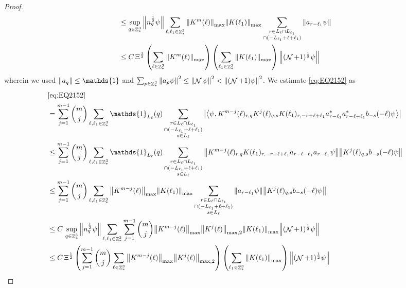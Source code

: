 \documentclass[sn-mathphys, Numbered ,a4paper]{sn-jnl}%
\DeclareMathOperator{\Z}{\mathbb{Z}}
\DeclareMathOperator{\NN}{\mathcal{N}}
\newcommand{\half}{\frac{1}{2}}
\newcommand{\eva}[1]{\left\langle #1 \right\rangle}
\theoremstyle{plain}
\theoremstyle{definition}
\theoremstyle{remark}
\theoremstyle{plain}
\theoremstyle{definition}
\theoremstyle{remark}
\begin{document}
\begin{proof}
\begin{align}
	&\leq \sup\limits_{q \in \Z^3_*} \norm{ n_{q}^\half \psi} \sum\limits_{\ell, \ell_1\in \Z^3_*} \norm{K^m(\ell)}_{\mathrm{max}} \norm{K(\ell_1)}_{\mathrm{max}} \sum\limits_{\substack{r\in L_{\ell} \cap L_{\ell_1} \\ \cap (-L_{\ell_1}+\ell+\ell_1)}} \norm{  a_{r-\ell_1} \psi}\nonumber\\  	
	&\leq C \, \Xi^\half \left(\sum\limits_{\ell \in \Z^3_*} \norm{K^m(\ell)}_{\mathrm{max}}\right)\left( \sum\limits_{\ell_1\in \Z^3_*} \norm{ K(\ell_1)}_{\mathrm{max}} \right) \norm{ (\NN+1)^{\frac{1}{2}} \psi }\label{eq:estEQ2151}
\end{align} 
wherein we used $\norm{a_q} \leq \mathds{1}$ and $\sum_{p\in \Z^3_*}\norm{a_p \psi}^2\leq\norm{\NN\psi}^2<\norm{(\NN+1)\psi}^2$. We estimate \eqref{eq:EQ2152} as
\begin{align}
	&\eqref{eq:EQ2152}\nonumber\\
	&= \sum\limits_{j=1}^{m-1} {{m}\choose j} \sum\limits_{\ell, \ell_1\in \Z^3_*}\mathds{1}_{L_{\ell}}(q) \sum\limits_{\substack{r\in L_{\ell} \cap L_{\ell_1}\\ \cap (-L_{\ell_1}+\ell+\ell_1)\\ s \in L_{\ell}}}  \abs{\eva{\psi, K^{m-j}(\ell)_{r,q} K^j(\ell)_{q,s} K(\ell_1)_{r,-r+\ell+\ell_1}  a^*_{r-\ell_1}a^*_{r-\ell-\ell_1}b_{-s}(-\ell) \psi }}\nonumber\\
	&\leq  \sum\limits_{j=1}^{m-1} {{m}\choose j} \sum\limits_{\ell, \ell_1\in \Z^3_*}\mathds{1}_{L_{\ell}}(q) \sum\limits_{\substack{r\in L_{\ell} \cap L_{\ell_1}\\ \cap (-L_{\ell_1}+\ell+\ell_1)\\ s \in L_{\ell}}}  \norm{ K^{m-j}(\ell)_{r,q} K(\ell_1)_{r,-r+\ell+\ell_1}  a_{r-\ell-\ell_1} a_{r-\ell_1} \psi}\norm{ K^j(\ell)_{q,s}  b_{-s}(-\ell) \psi }\nonumber\\
	&\leq  \sum\limits_{j=1}^{m-1} {{m}\choose j} \sum\limits_{\ell, \ell_1\in \Z^3_*} \norm{K^{m-j}(\ell)}_{\mathrm{max}} \norm{K(\ell_1)}_{\mathrm{max}}  \sum\limits_{\substack{r\in L_{\ell} \cap L_{\ell_1}\\ \cap (-L_{\ell_1}+\ell+\ell_1)\\ s \in L_{\ell}}} \norm{ a_{r-\ell_1} \psi}\norm{ K^j(\ell)_{q,s} b_{-s}(-\ell) \psi }\nonumber\\
	&\leq C\,\sup\limits_{q \in \Z^3_*}\norm{n_q^\half\psi} \sum\limits_{\ell,\ell_1 \in \Z^3_*} \sum\limits_{j=1}^{m-1} {{m}\choose j} \norm{K^{m-j}(\ell)}_{\mathrm{max}} \norm{ K^{j}(\ell)}_{\mathrm{max},2} \norm{ K(\ell_1) }_{\mathrm{max}}  \norm{ (\NN+1)^{\frac{1}{2}} \psi }\nonumber\\
	&\leq  C\,\Xi^\half \left( \sum\limits_{j=1}^{m-1} {{m}\choose j} \sum\limits_{\ell \in \Z^3_*} \norm{K^{m-j}(\ell)}_{\mathrm{max}} \norm{ K^{j}(\ell)}_{\mathrm{max},2}\right) \left( \sum\limits_{ \ell_1\in \Z^3_*}\norm{ K(\ell_1) }_{\mathrm{max}} \right) \norm{ (\NN+1)^{\frac{1}{2}} \psi }\label{eq:estEQ2152}
\end{align}
    

\end{proof}
\end{document}

